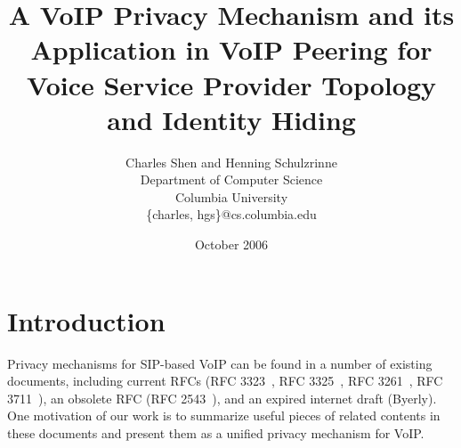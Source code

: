 \documentclass[letterpaper,notitlepage,times,12pt]{article}
\begin{document}
\date{October 2006}

\title{{\Large A VoIP Privacy Mechanism and its Application in VoIP Peering for Voice Service Provider Topology and Identity Hiding}}
\author{Charles Shen and Henning Schulzrinne \\
Department of Computer Science \\
Columbia University \\
\{charles, hgs\}@cs.columbia.edu
}

\maketitle




\section{Introduction}

Privacy mechanisms for SIP-based VoIP can be found in a number of existing documents, including current RFCs (RFC 3323~\cite{rfc3323}, RFC 3325~\cite{rfc3325}, RFC 3261~\cite{rfc3261}, RFC 3711~\cite{rfc3711}), an obsolete RFC (RFC 2543~\cite{rfc2543}), and an expired internet draft (Byerly\cite{siphideroute}). One motivation of our work is to summarize useful pieces of related contents in these documents and present them as a unified privacy mechanism for VoIP.
\end{document}
